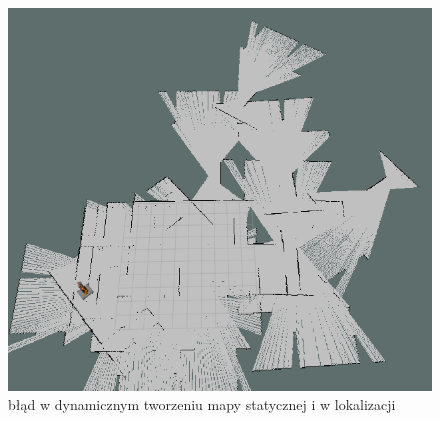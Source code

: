 		\begin{figure}
			\centering
			\includegraphics[width=\linewidth]{imgs/wstepne_badania/crazy.png}
			\caption{błąd w dynamicznym tworzeniu mapy statycznej i w lokalizacji}
			\label{fig:tf}
		\end{figure}
		
		
		



